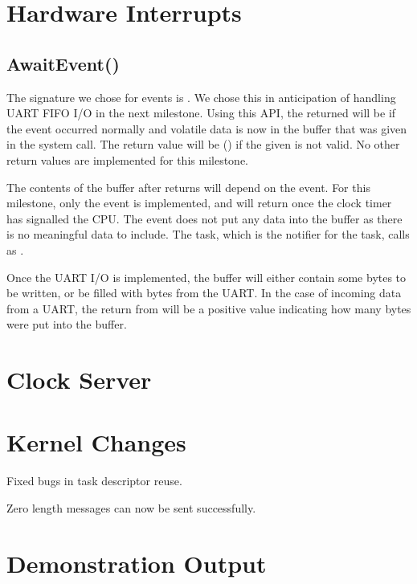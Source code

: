 \documentclass[pdftex,10pt,a4paper]{article}
\begin{document}
\newpage
\section*{Hardware Interrupts}

\subsection*{AwaitEvent()}

The signature we chose for events is
. We chose
this in anticipation of handling UART FIFO I/O in the next
milestone. Using this API, the returned  will be  if
the event occurred normally and volatile data is now in the
 buffer that was given in the system call. The return value
will be  () if the given  is
not valid. No other return values are implemented for this milestone.

The contents of the  buffer after  returns
will depend on the event. For this milestone, only the
 event is implemented, and will return once the clock
timer has signalled the CPU. The  event does not put
any data into the  buffer as there is no meaningful data to
include. The  task, which is the notifier for the
 task, calls  as
.

Once the UART I/O is implemented, the  buffer will either
contain some bytes to be written, or be filled with bytes from the
UART. In the case of incoming data from a UART, the return from
 will be a positive value indicating how many bytes
were put into the  buffer.

\section*{Clock Server}




\section*{Kernel Changes}

Fixed bugs in task descriptor reuse.

Zero length messages can now be sent successfully.

\section*{Demonstration Output}
\end{document}
